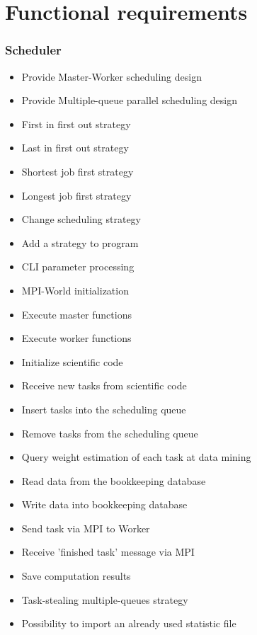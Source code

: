 {


\setcounter{func}{10}
\renewcommand{\labelitemi}{
	\ifnum \value{func}<10$/F 0\arabic{func} /$\addtocounter{func}{10}
	\else $/F \arabic{func} /$\addtocounter{func}{10}\fi
	}

\section{Functional requirements} 
	
	\subsubsection{Scheduler}
	
		\begin{itemize}
			\item Provide Master-Worker scheduling design 
			\item Provide Multiple-queue parallel scheduling design
			\item First in first out strategy
			\item Last in first out strategy
			\item Shortest job first strategy
			\item Longest job first strategy 
			\item Change scheduling strategy
			\item Add a strategy to program
			\item CLI parameter processing
			\item MPI-World initialization
			\item Execute master functions
			\item Execute worker functions
			\item Initialize scientific code
			\item Receive new tasks from scientific code
			\item Insert tasks into the scheduling queue
			\item Remove tasks from the scheduling queue%
			\item Query weight estimation of each task at data mining
			\item Read data from the bookkeeping database
			\item Write data into bookkeeping database
			\item Send task via MPI to Worker
			\item Receive 'finished task' message via MPI  
			\item Save computation results
			\item Task-stealing multiple-queues strategy
			\item Possibility to import an already used statistic file
		\end{itemize}
	
}
